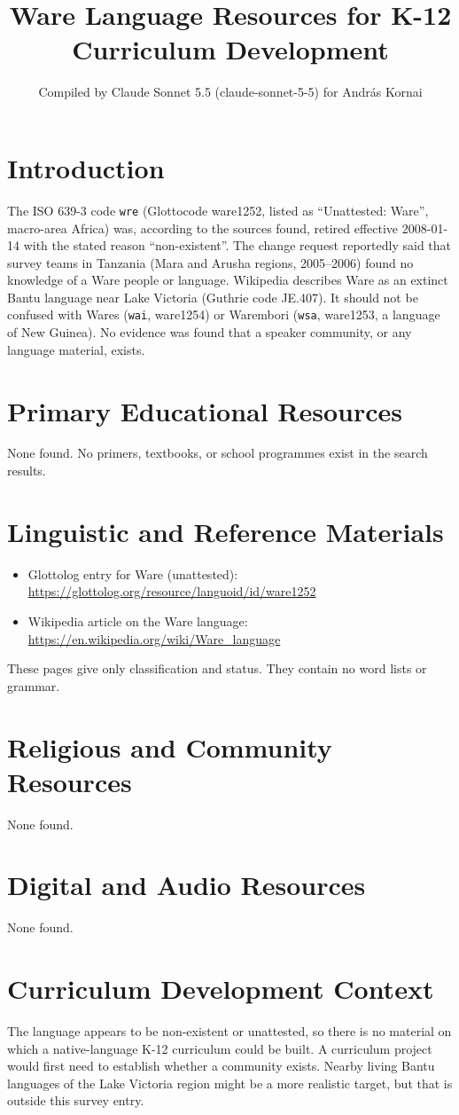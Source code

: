 \documentclass[12pt]{article}
\title{Ware Language Resources for K-12 Curriculum Development}
\author{Compiled by Claude Sonnet 5.5 (claude-sonnet-5-5) for Andr\'as Kornai}
\date{}
\begin{document}
\maketitle

\section{Introduction}
The ISO 639-3 code \texttt{wre} (Glottocode ware1252, listed as ``Unattested: Ware'', macro-area Africa) was, according to the sources found, retired effective 2008-01-14 with the stated reason ``non-existent''. The change request reportedly said that survey teams in Tanzania (Mara and Arusha regions, 2005--2006) found no knowledge of a Ware people or language. Wikipedia describes Ware as an extinct Bantu language near Lake Victoria (Guthrie code JE.407). It should not be confused with Wares (\texttt{wai}, ware1254) or Warembori (\texttt{wsa}, ware1253, a language of New Guinea). No evidence was found that a speaker community, or any language material, exists.

\section{Primary Educational Resources}
None found. No primers, textbooks, or school programmes exist in the search results.

\section{Linguistic and Reference Materials}
\begin{itemize}
\item Glottolog entry for Ware (unattested): \url{https://glottolog.org/resource/languoid/id/ware1252}
\item Wikipedia article on the Ware language: \url{https://en.wikipedia.org/wiki/Ware_language}
\end{itemize}
These pages give only classification and status. They contain no word lists or grammar.

\section{Religious and Community Resources}
None found.

\section{Digital and Audio Resources}
None found.

\section{Curriculum Development Context}
The language appears to be non-existent or unattested, so there is no material on which a native-language K-12 curriculum could be built. A curriculum project would first need to establish whether a community exists. Nearby living Bantu languages of the Lake Victoria region might be a more realistic target, but that is outside this survey entry.
\end{document}
